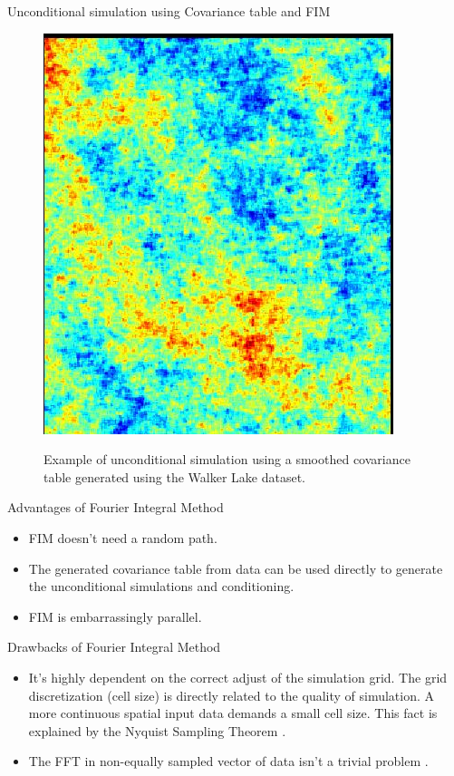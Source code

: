 \begin{frame}{Unconditional simulation using Covariance table and FIM}
\begin{figure}[!ht]
  \caption{Example of unconditional simulation using a smoothed covariance table generated using the Walker Lake dataset.}
  \centering
    \includegraphics[height=0.5\textheight]{figs/sim_cov_table.png}
    \label{cov_table_sim.fig}
\end{figure}
\end{frame}


\begin{frame}{Advantages of Fourier Integral Method}
\begin{itemize}
	\item FIM doesn't need a random path.
    \item The generated covariance table from data can be used directly to generate the unconditional simulations and conditioning.
    \item FIM is embarrassingly parallel.
\end{itemize}
\end{frame}

\begin{frame}{Drawbacks of Fourier Integral Method}
\begin{itemize}
	\item It's highly dependent on the correct adjust of the simulation grid. The grid discretization (cell size) is directly related to the quality of simulation. A more continuous spatial input data demands a small cell size. This fact is explained by the Nyquist Sampling Theorem \cite{pardo1993fourier}. 
    \item The FFT in non-equally sampled vector of data isn't a trivial problem \cite{keiner2009using}.
\end{itemize}
\end{frame}




